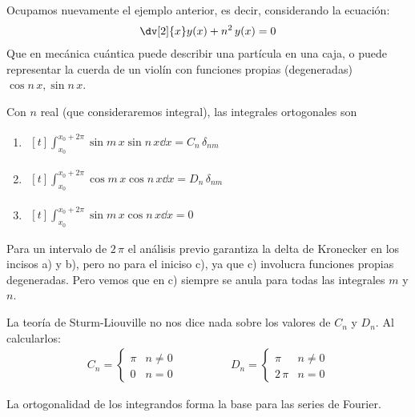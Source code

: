 Ocupamos nuevamente el ejemplo anterior, es decir, considerando la ecuación:
\begin{align*}
\dv[2]{x} y(x) + n^{2} \, y(x) = 0
\end{align*}
Que en mecánica cuántica puede describir una partícula en una caja, o puede representar la cuerda de un violín con funciones propias (degeneradas) $\cos n \, x, \sin n \, x$.
\par
Con $n$ real (que consideraremos integral), las integrales ortogonales son
\begin{enumerate}[label=\alph*)]
\item $\begin{aligned}[t] \int_{x_{0}}^{x_{0} + 2 \pi} \sin m \, x \sin n \, x \dd{x} = C_{n} \, \delta_{nm} \end{aligned} $ 
\item $\begin{aligned}[t] \int_{x_{0}}^{x_{0} + 2 \pi} \cos m \, x \cos n \, x \dd{x} = D_{n} \, \delta_{nm} \end{aligned} $ 
\item $\begin{aligned}[t] \int_{x_{0}}^{x_{0} + 2 \pi} \sin m \, x \cos n \, x \dd{x} = 0 \end{aligned} $
\end{enumerate}
Para un intervalo de $2 \, \pi$ el análisis previo garantiza la delta de Kronecker en los incisos a) y b), pero no para el iniciso c), ya que c) involucra funciones propias degeneradas. Pero vemos que en c) siempre se anula para todas las integrales $m$ y $n$.
\par
La teoría de Sturm-Liouville no nos dice nada sobre los valores de $C_{n}$ y $D_{n}$. Al calcularlos:
\begin{align*}
C_{n} = \begin{cases}
\pi  & n \neq 0 \\
0  & n = 0 \end{cases}
\hspace{2cm}
D_{n} = \begin{cases}
\pi & n \neq 0 \\
2 \, \pi & n = 0 \end{cases}
\end{align*}

La ortogonalidad de los integrandos forma la base para las series de Fourier.


